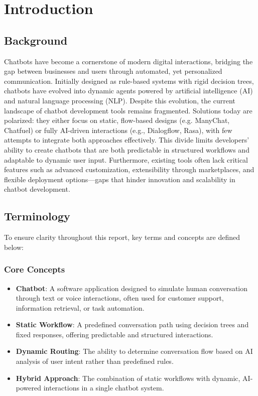 \chapter{Introduction}

\section{Background}
Chatbots have become a cornerstone of modern digital interactions, bridging the gap between businesses and users through automated, yet personalized communication. Initially designed as rule-based systems with rigid decision trees, chatbots have evolved into dynamic agents powered by artificial intelligence (AI) and natural language processing (NLP). Despite this evolution, the current landscape of chatbot development tools remains fragmented. Solutions today are polarized: they either focus on static, flow-based designs (e.g. ManyChat, Chatfuel) or fully AI-driven interactions (e.g., Dialogflow, Rasa), with few attempts to integrate both approaches effectively. This divide limits developers' ability to create chatbots that are both predictable in structured workflows and adaptable to dynamic user input. Furthermore, existing tools often lack critical features such as advanced customization, extensibility through marketplaces, and flexible deployment options—gaps that hinder innovation and scalability in chatbot development.

\section{Terminology}
To ensure clarity throughout this report, key terms and concepts are defined below:

\subsection{Core Concepts}
\begin{itemize}
    \item \textbf{Chatbot}: A software application designed to simulate human conversation through text or voice interactions, often used for customer support, information retrieval, or task automation.
    
    \item \textbf{Static Workflow}: A predefined conversation path using decision trees and fixed responses, offering predictable and structured interactions.
    
    \item \textbf{Dynamic Routing}: The ability to determine conversation flow based on AI analysis of user intent rather than predefined rules.
    
    \item \textbf{Hybrid Approach}: The combination of static workflows with dynamic, AI-powered interactions in a single chatbot system.

\end{itemize}

